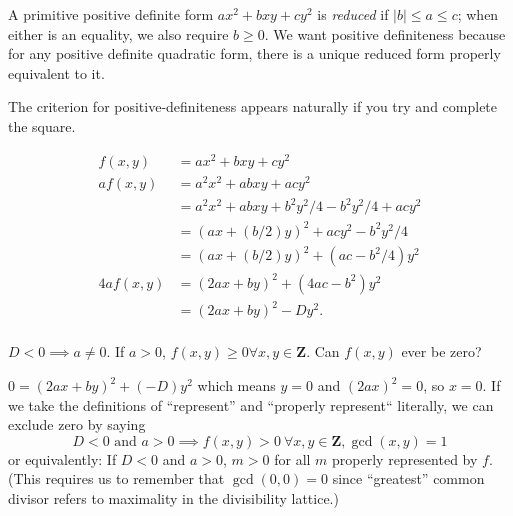 A primitive positive definite form $ax^2+bxy+cy^2$ is \emph{reduced} if $|b|\leq a\leq c$; when either is an equality, we also require $b\geq 0$. We want positive definiteness because for any positive definite quadratic form, there is a unique reduced form properly equivalent to it.

The criterion for positive-definiteness appears naturally if you try and complete the square.

\begin{align*}
  f(x,y) &= ax^2 + bxy + cy^2\\
 af(x,y) &= a^2x^2 + abxy + acy^2\\
         &= a^2x^2 + abxy + b^2y^2/4 - b^2y^2/4 + acy^2\\
         &= (ax + (b/2)y)^2 + acy^2-b^2y^2/4\\
         &= (ax + (b/2)y)^2 + (ac-b^2/4)y^2\\
4af(x,y) &= (2ax+by)^2 + (4ac-b^2)y^2\\
         &= (2ax+by)^2 - Dy^2.\\
\end{align*}

$D<0\implies a\neq 0$. If $a>0$, $f(x,y)\geq 0\forall x,y\in\mathbf{Z}$. Can $f(x,y)$ ever be zero?

$0 = (2ax+by)^2 + (-D)y^2$
which means $y=0$ and $(2ax)^2 = 0$, so $x=0$. If we take the definitions of ``represent'' and ``properly represent`` literally, we can exclude zero by saying
\[D<0\text{ and }a>0\implies f(x,y) > 0\ \forall x,y\in\mathbf{Z}, \gcd(x,y)=1\]
or equivalently: If $D<0$ and $a>0$, $m>0$ for all $m$ properly represented by $f$. (This requires us to remember that $\gcd(0,0)=0$ since ``greatest'' common divisor refers to maximality in the divisibility lattice.)


